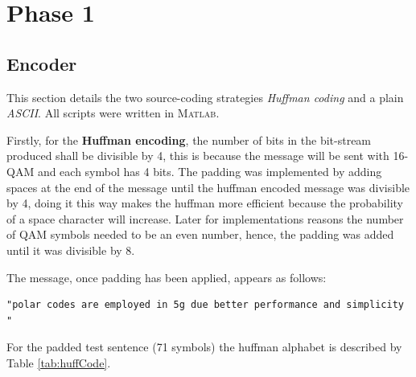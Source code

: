 \section{Phase 1}

\subsection{Encoder}

\label{sec:encoder}

This section details the two source-coding strategies \emph{Huffman coding} and a plain \emph{ASCII}. All scripts were written in \textsc{Matlab}.

\label{ssec:huffman}

Firstly, for the \textbf{Huffman encoding}, the number of bits in the bit-stream produced shall be divisible by 4, this is because the message will be sent with 16-QAM and each symbol has 4 bits. The padding was implemented by adding spaces at the end of the message until the huffman encoded message was divisible by 4, doing it this way makes the huffman more efficient because the probability of a space character will increase. Later for implementations reasons the number of QAM symbols needed to be an even number, hence, the padding was added until it was divisible by 8. 

The message, once padding has been applied, appears as follows:

\begin{center}
    \begin{verbatim}
"polar codes are employed in 5g due better performance and simplicity     "
    \end{verbatim}
    
\end{center}

For the padded test sentence (71 symbols) the huffman alphabet is described by Table \ref{tab:huffCode}.

